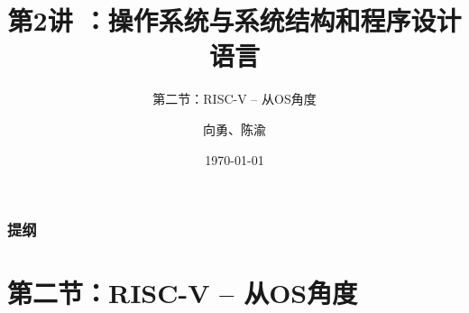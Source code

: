 


\title[第2讲]{第2讲 ：操作系统与系统结构和程序设计语言} %
\subtitle{第二节：RISC-V -- 从OS角度}
\author{向勇、陈渝} %
\date{\today} %



\begin{frame}
\titlepage %
\end{frame}

\begin{frame}
\frametitle{提纲} %
\tableofcontents %
\end{frame}


\section{第二节：RISC-V -- 从OS角度 } %

